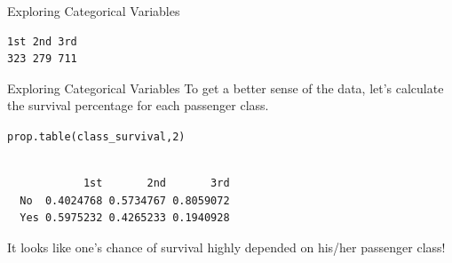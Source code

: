 \documentclass{beamer}\usepackage[]{graphicx}\usepackage[]{color}
\makeatletter
\newcommand{\hlnum}[1]{\textcolor[rgb]{0.824,0.412,0.118}{#1}}%
\newcommand{\hlopt}[1]{\textcolor[rgb]{1,0.894,0.769}{#1}}%
\newcommand{\hlstd}[1]{\textcolor[rgb]{1,0.894,0.769}{#1}}%
\newcommand{\hlkwb}[1]{\textcolor[rgb]{0.804,0.776,0.451}{#1}}%
\newcommand{\hlkwd}[1]{\textcolor[rgb]{1,0.78,0.769}{#1}}%
\newenvironment{kframe}{%
 \def\at@end@of@kframe{}%
 \ifinner\ifhmode%
  \def\at@end@of@kframe{\end{minipage}}%
  \begin{minipage}{\columnwidth}%
 \fi\fi%
 \def\FrameCommand##1{\hskip\@totalleftmargin \hskip-\fboxsep
 \colorbox{shadecolor}{##1}\hskip-\fboxsep
     \hskip-\linewidth \hskip-\@totalleftmargin \hskip\columnwidth}%
 \MakeFramed {\advance\hsize-\width
   \@totalleftmargin\z@ \linewidth\hsize
   \@setminipage}}%
 {\par\unskip\endMakeFramed%
 \at@end@of@kframe}
\newenvironment{knitrout}{}{} %
\makeatother
\begin{document}
\begin{darkframes}
\begin{frame}[fragile]{Exploring Categorical Variables}
\begin{knitrout}
\begin{kframe}
\begin{verbatim}
1st 2nd 3rd 
323 279 711 
\end{verbatim}
\end{kframe}
\end{knitrout}
    \end{frame}




    \begin{frame}[fragile]{Exploring Categorical Variables}
      To get a better sense of the data, let's calculate the survival percentage for each passenger class.
\begin{knitrout}
\begin{kframe}
\begin{alltt}
  \hlkwd{prop.table}\hlstd{(class_survival,} \hlnum{2}\hlstd{)}
\end{alltt}
\begin{verbatim}
     
            1st       2nd       3rd
  No  0.4024768 0.5734767 0.8059072
  Yes 0.5975232 0.4265233 0.1940928
\end{verbatim}
\end{kframe}
\end{knitrout}
      \pause

      It looks like one's chance of survival highly depended on his/her passenger class!
    \end{frame}




\end{darkframes}
\end{document}
